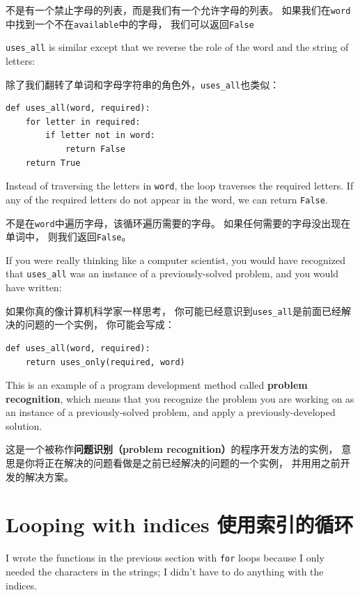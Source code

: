 \documentclass[10pt]{book}
\begin{document}
\begin{CJK}{UTF8}{gbsn}
不是有一个禁止字母的列表，而是我们有一个允许字母的列表。
如果我们在{\tt word}中找到一个不在{\tt available}中的字母，
我们可以返回{\tt False}

\verb"uses_all" is similar except that we reverse the role
of the word and the string of letters:

除了我们翻转了单词和字母字符串的角色外，\verb"uses_all"也类似：

\begin{verbatim}
def uses_all(word, required):
    for letter in required: 
        if letter not in word:
            return False
    return True
\end{verbatim}
%
Instead of traversing the letters in {\tt word}, the loop
traverses the required letters.  If any of the required letters
do not appear in the word, we can return {\tt False}.

不是在{\tt word}中遍历字母，该循环遍历需要的字母。
如果任何需要的字母没出现在单词中，
则我们返回{\tt False}。

If you were really thinking like a computer scientist, you would
have recognized that \verb"uses_all" was an instance of a
previously-solved problem, and you would have written:

如果你真的像计算机科学家一样思考，
你可能已经意识到\verb"uses_all"是前面已经解决的问题的一个实例，
你可能会写成：

\begin{verbatim}
def uses_all(word, required):
    return uses_only(required, word)
\end{verbatim}
%
This is an example of a program development method called {\bf problem
recognition}, which means that you recognize the problem you are
working on as an instance of a previously-solved problem, and apply a
previously-developed solution.

这是一个被称作{\bf 问题识别（problem recognition）}的程序开发方法的实例，
意思是你将正在解决的问题看做是之前已经解决的问题的一个实例，
并用用之前开发的解决方案。

\section{Looping with indices 使用索引的循环}

I wrote the functions in the previous section with {\tt for}
loops because I only needed the characters in the strings; I didn't
have to do anything with the indices.


\end{CJK}
\end{document}
